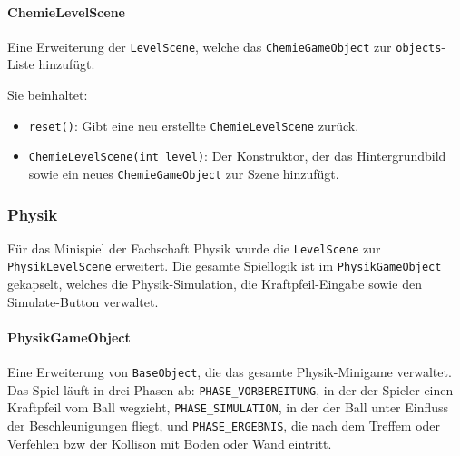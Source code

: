 \paragraph{ChemieLevelScene}
Eine Erweiterung der \texttt{LevelScene}, welche das \texttt{ChemieGameObject} zur \texttt{objects}-Liste hinzufügt.

Sie beinhaltet:
\begin{sloppypar}
    \begin{itemize}
        \item \texttt{reset()}: Gibt eine neu erstellte \texttt{ChemieLevelScene} zurück.
        \item \texttt{ChemieLevelScene(int level)}: Der Konstruktor, der das Hintergrundbild sowie ein neues \texttt{ChemieGameObject} zur Szene hinzufügt.
    \end{itemize}
\end{sloppypar}

\subsubsection{Physik}

\begin{sloppypar}
    Für das Minispiel der Fachschaft Physik wurde die \texttt{LevelScene} zur \texttt{PhysikLevelScene} erweitert.
    Die gesamte Spiellogik ist im \texttt{PhysikGameObject} gekapselt, welches die Physik-Simulation, die Kraftpfeil-Eingabe sowie den Simulate-Button verwaltet.
\end{sloppypar}

\paragraph{PhysikGameObject}
Eine Erweiterung von \texttt{BaseObject}, die das gesamte Physik-Minigame verwaltet.
Das Spiel läuft in drei Phasen ab: \texttt{PHASE\_VORBEREITUNG}, in der der Spieler einen Kraftpfeil vom Ball wegzieht, \texttt{PHASE\_SIMULATION}, in der der Ball unter Einfluss der Beschleunigungen fliegt, und \texttt{PHASE\_ERGEBNIS}, die nach dem Treffem oder Verfehlen bzw der Kollison mit Boden oder Wand eintritt.

